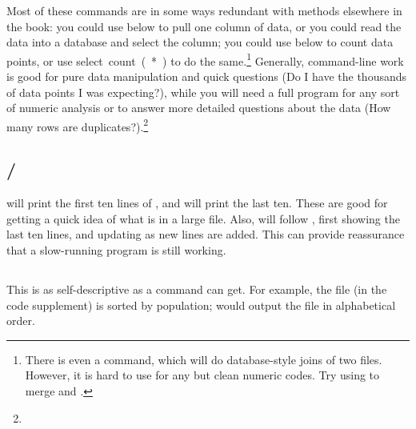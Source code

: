 Most of these commands are in some ways redundant with methods
elsewhere in the book: you could use  below to pull one column
of data, or you could read the data into a database and \si{select}
the column; you could use  below to count data points, or use
\si{select count(*)} to do the same.\footnote{
There is even a 
command, which will do database-style joins of two files. However, it is
hard to use for any but clean numeric codes. Try using  to
merge  and .} Generally, 
command-line work is good for pure data manipulation and quick questions (Do I have the thousands 
of data points I was expecting?), while you will need a full program 
for any sort of numeric analysis or to answer more detailed questions
about the data (How many rows are
duplicates?).\footnote{}

\subsection{/}  will print the
first ten lines of
, and  will print the last ten. These are
good for getting a quick idea of what is in a large file.  Also,
 will follow , first showing the
last ten lines, and updating as new lines are added. This can provide
reassurance that a slow-running program is still working.



\subsection{} This is as self-descriptive as a command can
get. For example, the  file (in the code supplement)
is sorted by population;  would output the file in
alphabetical order.


